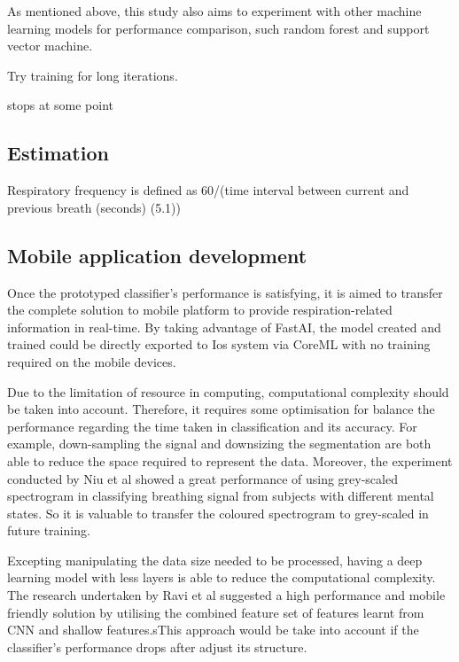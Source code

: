 As mentioned above, this study also aims to experiment with other machine learning models for performance comparison, such random forest and support vector machine. 

Try training for long iterations.


stops at some point

\subsection{Estimation}
Respiratory frequency is defined as 60/(time interval between current and previous breath (seconds) (5.1))\cite{Mason2002SignalMonitoring}

\subsection{Mobile application development}
Once the prototyped classifier's performance is satisfying, it is aimed to transfer the complete solution to mobile platform to provide respiration-related information in real-time. By taking advantage of FastAI, the model created and trained could be directly exported to Ios system via CoreML with no training required on the mobile devices.

Due to the limitation of resource in computing, computational complexity should be taken into account. Therefore, it requires some optimisation for balance the performance regarding the time taken in classification and its accuracy. For example, down-sampling the signal and downsizing the segmentation are both able to reduce the space required to represent the data. Moreover, the experiment conducted by Niu et al showed a great performance of using grey-scaled spectrogram in classifying breathing signal from subjects with different mental states.\cite{Niu2019AState} So it is valuable to transfer the coloured spectrogram to grey-scaled in future training. 

Excepting manipulating the data size needed to be processed, having a deep learning model with less layers is able to reduce the computational complexity. The research undertaken by Ravi et al suggested a high performance and mobile friendly solution by utilising the combined feature set of features learnt from CNN and shallow features.\cite{Ravi2017ADevices}sThis approach would be take into account if the classifier's performance drops after adjust its structure.



